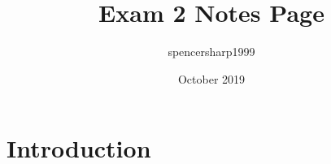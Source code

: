 \documentclass{article}
\title{Exam 2 Notes Page}
\author{spencersharp1999 }
\date{October 2019}
\begin{document}
\maketitle

\section{Introduction}
\end{document}

